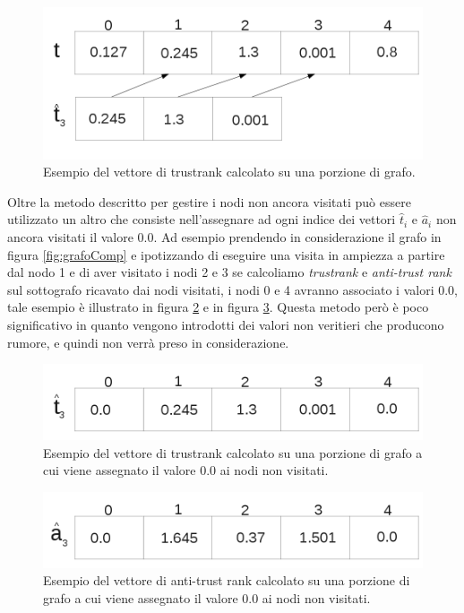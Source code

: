 \begin{figure}
\centering
 \includegraphics{immagini/test/tBFSmodoB}
 \caption{Esempio del vettore di trustrank calcolato su una porzione di grafo.}
 \label{fig:tBFSmodoB}
\end{figure}

Oltre la metodo descritto per gestire i nodi non ancora visitati può essere utilizzato un altro che consiste nell'assegnare ad ogni indice dei vettori \(\hat{t}_i\) e \(\hat{a}_i\) non ancora visitati il valore 0.0. Ad esempio prendendo in considerazione il grafo in figura \ref{fig:grafoComp} e ipotizzando di eseguire una visita in ampiezza a partire dal nodo 1 e di aver visitato i nodi 2 e 3  se calcoliamo \textit{trustrank} e \textit{anti-trust rank} sul sottografo ricavato dai nodi visitati, i nodi 0 e 4 avranno associato i valori 0.0, tale esempio è illustrato in figura \ref{fig:tBFSmodoA} e in figura \ref{fig:aBFSmodoA}. Questa metodo però è poco significativo in quanto vengono introdotti dei valori non veritieri che producono rumore, e quindi non verrà preso in considerazione.
\begin{figure}
\centering
 \includegraphics{immagini/test/tBFSmodoA}
 \caption{Esempio del vettore di trustrank calcolato su una porzione di grafo a cui viene assegnato il valore 0.0 ai nodi non visitati.}
 \label{fig:tBFSmodoA}
\end{figure}
\begin{figure}
\centering
 \includegraphics{immagini/test/aBFSmodoA}
 \caption{Esempio del vettore di anti-trust rank calcolato su una porzione di grafo a cui viene assegnato il valore 0.0 ai nodi non visitati.}
 \label{fig:aBFSmodoA}
\end{figure}

